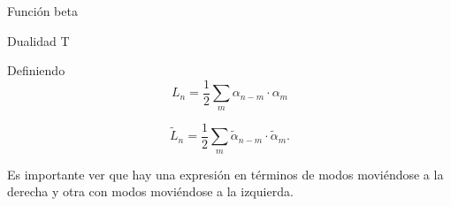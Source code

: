 Función beta

Dualidad T





Definiendo
\begin{equation}
  L_n=\frac 1 2 \sum_m \alpha_{n-m} \cdot \alpha_m
\end{equation}

\begin{equation}
  \tilde{L}_n=\frac 1 2 \sum_m \tilde{\alpha}_{n-m} \cdot \tilde{\alpha}_m.
\end{equation}

Es importante ver que hay una expresión en términos de modos moviéndose a la derecha
y otra con modos moviéndose a la izquierda.

